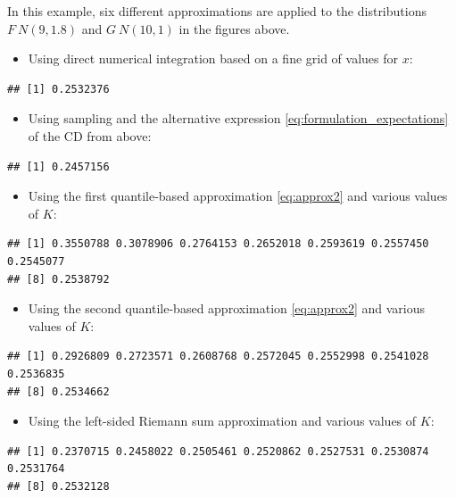 \documentclass[
]{article}
\providecommand{\tightlist}{%
  \setlength{\itemsep}{0pt}\setlength{\parskip}{0pt}}
\begin{document}
In this example, six different approximations are applied to the
distributions \(F~N(9, 1.8)\) and \(G~N(10, 1)\) in the figures above.

\begin{itemize}
\tightlist
\item
  Using direct numerical integration based on a fine grid of values for
  \(x\):
\end{itemize}

\begin{verbatim}
## [1] 0.2532376
\end{verbatim}

\begin{itemize}
\tightlist
\item
  Using sampling and the alternative expression
  \eqref{eq:formulation_expectations} of the CD from above:
\end{itemize}

\begin{verbatim}
## [1] 0.2457156
\end{verbatim}

\begin{itemize}
\tightlist
\item
  Using the first quantile-based approximation \eqref{eq:approx2} and
  various values of \(K\):
\end{itemize}

\begin{verbatim}
## [1] 0.3550788 0.3078906 0.2764153 0.2652018 0.2593619 0.2557450 0.2545077
## [8] 0.2538792
\end{verbatim}

\begin{itemize}
\tightlist
\item
  Using the second quantile-based approximation \eqref{eq:approx2} and
  various values of \(K\):
\end{itemize}

\begin{verbatim}
## [1] 0.2926809 0.2723571 0.2608768 0.2572045 0.2552998 0.2541028 0.2536835
## [8] 0.2534662
\end{verbatim}

\begin{itemize}
\tightlist
\item
  Using the left-sided Riemann sum approximation and various values of
  \(K\):
\end{itemize}

\begin{verbatim}
## [1] 0.2370715 0.2458022 0.2505461 0.2520862 0.2527531 0.2530874 0.2531764
## [8] 0.2532128
\end{verbatim}
\end{document}
